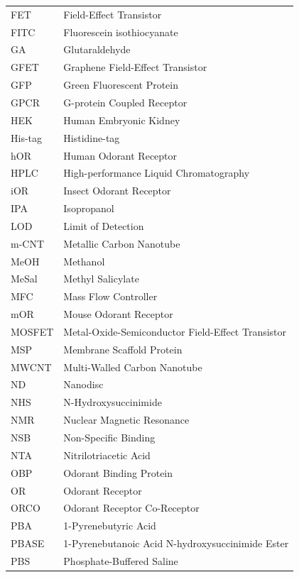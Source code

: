 \documentclass[
  a4paper,
]{scrbook}
\begin{document}
\newpage
\fancyhf{} %
\thispagestyle{fancy} %
\renewcommand{\headrulewidth}{0pt}
\fancyfoot[L]{\thepage} %
\begin{table}[H]
  \begin{tabular}{@{}p{} p{}@{}}  %
    FET  & Field-Effect Transistor  \\[5pt]
    FITC  & Fluorescein isothiocyanate  \\[5pt]
    GA  & Glutaraldehyde  \\[5pt]
    GFET  & Graphene Field-Effect Transistor  \\[5pt]
    GFP  & Green Fluorescent Protein  \\[5pt]
    GPCR  & G-protein Coupled Receptor  \\[5pt]
    HEK  & Human Embryonic Kidney  \\[5pt]
    His-tag  & Histidine-tag  \\[5pt]
    hOR  & Human Odorant Receptor  \\[5pt]
    HPLC  & High-performance Liquid Chromatography   \\[5pt]
    iOR  & Insect Odorant Receptor  \\[5pt]
    IPA  & Isopropanol  \\[5pt]
    LOD  & Limit of Detection  \\[5pt]
    m-CNT  & Metallic Carbon Nanotube   \\[5pt]
    MeOH  & Methanol   \\[5pt]
    MeSal  & Methyl Salicylate   \\[5pt]
    MFC  & Mass Flow Controller   \\[5pt]
    mOR  & Mouse Odorant Receptor  \\[5pt]
    MOSFET  & Metal-Oxide-Semiconductor Field-Effect Transistor  \\[5pt]
    MSP  & Membrane Scaffold Protein  \\[5pt]
    MWCNT  & Multi-Walled Carbon Nanotube  \\[5pt]
    ND  & Nanodisc  \\[5pt]
    NHS  & N-Hydroxysuccinimide  \\[5pt]
    NMR  & Nuclear Magnetic Resonance  \\[5pt]
    NSB  & Non-Specific Binding   \\[5pt]
    NTA  & Nitrilotriacetic Acid   \\[5pt]
    OBP  & Odorant Binding Protein  \\[5pt]
    OR  & Odorant Receptor  \\[5pt]
    ORCO  & Odorant Receptor Co-Receptor  \\[5pt]
    PBA  & 1-Pyrenebutyric Acid  \\[5pt]
    PBASE  & 1-Pyrenebutanoic Acid N-hydroxysuccinimide Ester  \\[5pt]
    PBS  & Phosphate-Buffered Saline  \\[5pt]
  \end{tabular}
\end{table}
\end{document}
